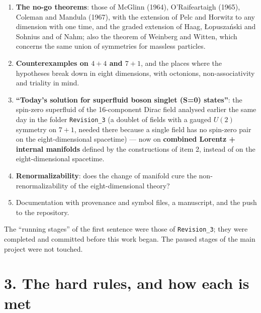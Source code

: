 \documentclass[
  10pt,
]{article}
\providecommand{\tightlist}{%
  \setlength{\itemsep}{0pt}\setlength{\parskip}{0pt}}
\begin{document}
\begin{enumerate}
\def\labelenumi{\arabic{enumi}.}
\tightlist
\item
  \textbf{The no-go theorems}: those of McGlinn (1964), O'Raifeartaigh
  (1965), Coleman and Mandula (1967), with the extension of Pelc and
  Horwitz to any dimension with one time, and the graded extension of
  Haag, Łopuszański and Sohnius and of Nahm; also the theorem of
  Weinberg and Witten, which concerns the same union of symmetries for
  massless particles.
\item
  \textbf{Counterexamples on \(4+4\) and \(7+1\)}, and the places where
  the hypotheses break down in eight dimensions, with octonions,
  non-associativity and triality in mind.
\item
  \textbf{``Today's solution for superfluid boson singlet (S=0)
  states''}: the spin-zero superfluid of the 16-component Dirac field
  analysed earlier the same day in the folder \texttt{Revision\_3} (a
  doublet of fields with a gauged \(U(2)\) symmetry on \(7+1\), needed
  there because a single field has no spin-zero pair on the
  eight-dimensional spacetime) --- now on \textbf{combined Lorentz +
  internal manifolds} defined by the constructions of item 2, instead of
  on the eight-dimensional spacetime.
\item
  \textbf{Renormalizability}: does the change of manifold cure the
  non-renormalizability of the eight-dimensional theory?
\item
  Documentation with provenance and symbol files, a manuscript, and the
  push to the repository.
\end{enumerate}

The ``running stages'' of the first sentence were those of
\texttt{Revision\_3}; they were completed and committed before this work
began. The paused stages of the main project were not touched.

\hypertarget{the-hard-rules-and-how-each-is-met}{%
\section{3. The hard rules, and how each is
met}\label{the-hard-rules-and-how-each-is-met}}
\end{document}
